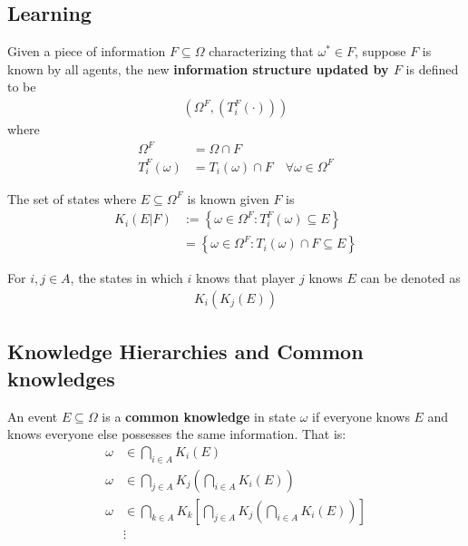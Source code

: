 \documentclass{article}
\begin{document}
   	\subsection{Learning}
   	\begin{definition}
   		Given a piece of information $F \subseteq \Omega$ characterizing that $\omega^* \in F$, suppose $F$ is known by all agents,
   		the new \textbf{information structure updated by $F$} is defined to be
   		\begin{align}
   			(\Omega^F, (T^F_i(\cdot)))
   		\end{align}
   		where
   		\begin{align}
   			\Omega^F &= \Omega \cap F \\
   			T_i^F(\omega) &= T_i(\omega) \cap F\quad \forall \omega \in \Omega^F
   		\end{align}
   	\end{definition}
   	\begin{definition}
   		The set of states where $E \subseteq \Omega^F$ is known given $F$ is 
   		\begin{align}
   			K_i(E|F) &:= \left\{
   			\omega \in \Omega^F: T_i^F(\omega) \subseteq E
   			\right\} \\
   			&= \left\{
   			\omega \in \Omega^F: T_i(\omega) \cap F \subseteq E
   			\right\}
   		\end{align}
   	\end{definition}
   	
   	\begin{notation}
   		For $i, j \in A$, the states in which $i$ knows that player $j$ knows $E$ can be denoted as
   		\begin{align}
   			K_i(K_j(E))
   		\end{align}
   	\end{notation}
   	
   	\subsection{Knowledge Hierarchies and Common knowledges}
   	\begin{definition}
   		An event $E \subseteq \Omega$ is a \textbf{common knowledge} in state $\omega$ if everyone knows $E$ and knows everyone else possesses the same information. That is:
   		\begin{align}
   			\omega &\in \bigcap_{i \in A} K_i(E) \\
   			\omega &\in \bigcap_{j \in A} K_j \left(\bigcap_{i \in A} K_i(E) \right) \\
   			\omega &\in \bigcap_{k \in A} K_k \left[
	   			\bigcap_{j \in A} K_j \left(\bigcap_{i \in A} K_i(E) \right)
   			\right] \\
   			&\vdots
   		\end{align}
   	\end{definition}
   	
\end{document}
